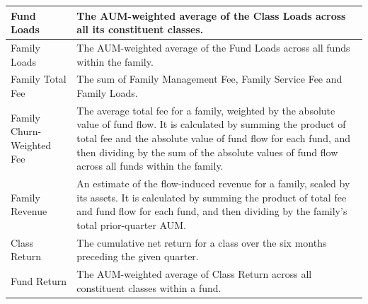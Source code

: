 \begin{longtable}{lp{}}
    \midrule
    Fund Loads                     & The AUM-weighted average of the Class Loads across all its constituent classes.                                                                                                                                                                                                                                   \\
    \midrule
    Family Loads                   & The AUM-weighted average of the Fund Loads across all funds within the family.                                                                                                                                                                                                                                    \\
    \midrule
    Family Total Fee               & The sum of Family Management Fee, Family Service Fee and Family Loads.                                                                                                                                                                                                                                            \\
    \midrule
    Family Churn-Weighted Fee      & The average total fee for a family, weighted by the absolute value of fund flow. It is calculated by summing the product of total fee and the absolute value of fund flow for each fund, and then dividing by the sum of the absolute values of fund flow across all funds within the family.                     \\
    \midrule
    Family Revenue                 & An estimate of the flow-induced revenue for a family, scaled by its assets. It is calculated by summing the product of total fee and fund flow for each fund, and then dividing by the family's total prior-quarter AUM\@.                                                                                          \\
    \midrule
    Class Return                   & The cumulative net return for a class over the six months preceding the given quarter.                                                                                                                                                                                                                            \\
    \midrule
    Fund Return                    & The AUM-weighted average of Class Return across all constituent classes within a fund.                                                                                                                                                                                                                            \\

\end{longtable}
